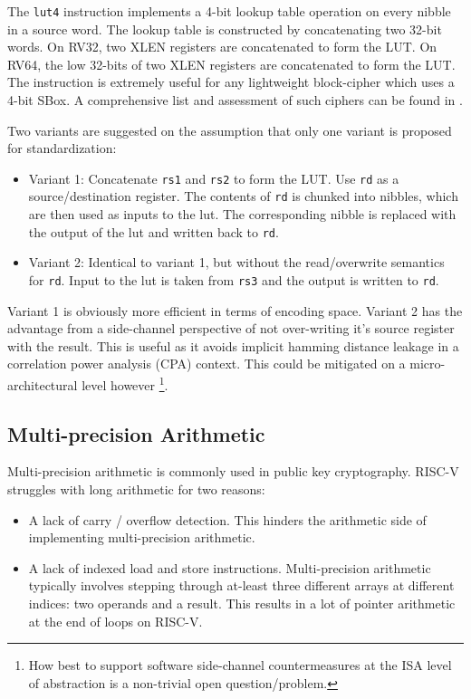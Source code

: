 The {\tt lut4} instruction implements a 4-bit lookup table operation
on every nibble in a source word.
The lookup table is constructed by concatenating two 32-bit words.
On RV32, two XLEN registers are concatenated to form the LUT.
On RV64, the low 32-bits of two XLEN registers are concatenated to form
the LUT.
The instruction is extremely useful for any lightweight block-cipher
which uses a 4-bit SBox.
A comprehensive list and assessment of such ciphers can be found
in \cite{TGMGD:19}.

Two variants are suggested on the assumption that only one variant is
proposed for standardization:
\begin{itemize}
\item Variant 1: Concatenate {\tt rs1} and {\tt rs2} to form the LUT.
    Use {\tt rd} as a source/destination register.
    The contents of {\tt rd} is chunked into nibbles, which are then
    used as inputs to the lut. The corresponding nibble is replaced
    with the output of the lut and written back to {\tt rd}.
\item Variant 2: Identical to variant 1, but without the read/overwrite
    semantics for {\tt rd}. Input to the lut is taken from {\tt rs3}
    and the output is written to {\tt rd}.
\end{itemize}
Variant 1 is obviously more efficient in terms of encoding space.
Variant 2 has the advantage from a side-channel perspective
of not over-writing it's source register with the result.
This is useful as it avoids implicit hamming distance leakage in
a correlation power analysis (CPA) context. This could be mitigated
on a micro-architectural level however
\footnote{
    How best to support software side-channel countermeasures at the
    ISA level of abstraction is a non-trivial open question/problem.
}.


\subsection{Multi-precision Arithmetic}

Multi-precision arithmetic is commonly used in public key cryptography.
RISC-V struggles with long arithmetic for two reasons:

\begin{itemize}
\item A lack of carry / overflow detection. This hinders the arithmetic
    side of implementing multi-precision arithmetic.

\item A lack of indexed load and store instructions.
    Multi-precision arithmetic typically involves stepping through
    at-least three different arrays at different indices: two operands
    and a result.
    This results in a lot of pointer arithmetic at the end of loops
    on RISC-V.
\end{itemize}

